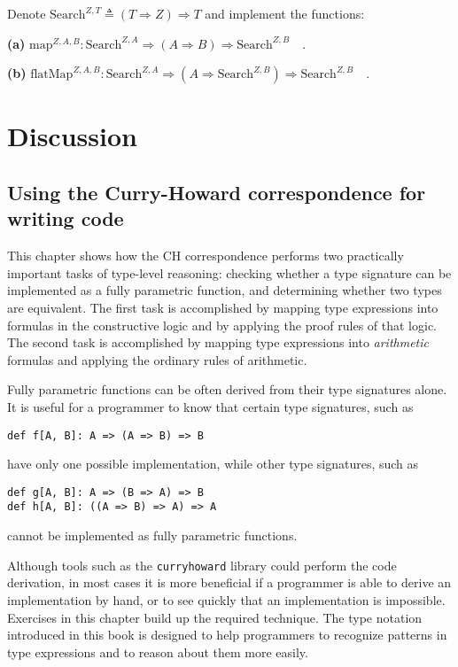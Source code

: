 Denote $\text{Search}^{Z,T}\triangleq\left(T\Rightarrow Z\right)\Rightarrow T$
and implement the functions:

\textbf{(a)} $\text{map}^{Z,A,B}:\text{Search}^{Z,A}\Rightarrow\left(A\Rightarrow B\right)\Rightarrow\text{Search}^{Z,B}\quad.$

\textbf{(b)} $\text{flatMap}^{Z,A,B}:\text{Search}^{Z,A}\Rightarrow(A\Rightarrow\text{Search}^{Z,B})\Rightarrow\text{Search}^{Z,B}\quad.$

\section{Discussion}

\subsection{Using the Curry-Howard correspondence for writing code}

This chapter shows how the CH correspondence performs two practically
important tasks of type-level reasoning: checking whether a type signature
can be implemented as a fully parametric function, and determining
whether two types are equivalent. The first task is accomplished by
mapping type expressions into formulas in the constructive logic and
by applying the proof rules of that logic. The second task is accomplished
by mapping type expressions into \emph{arithmetic} formulas and applying
the ordinary rules of arithmetic.

Fully parametric functions can be often derived from their type signatures
alone. It is useful for a programmer to know that certain type signatures,
such as
\begin{lstlisting}
def f[A, B]: A => (A => B) => B
\end{lstlisting}
have only one possible implementation, while other type signatures,
such as
\begin{lstlisting}
def g[A, B]: A => (B => A) => B
def h[A, B]: ((A => B) => A) => A
\end{lstlisting}
cannot be implemented as fully parametric functions.

Although tools such as the \texttt{curryhoward} library could perform
the code derivation, in most cases it is more beneficial if a programmer
is able to derive an implementation by hand, or to see quickly that
an implementation is impossible. Exercises in this chapter build up
the required technique. The type notation introduced in this book
is designed to help programmers to recognize patterns in type expressions
and to reason about them more easily.

